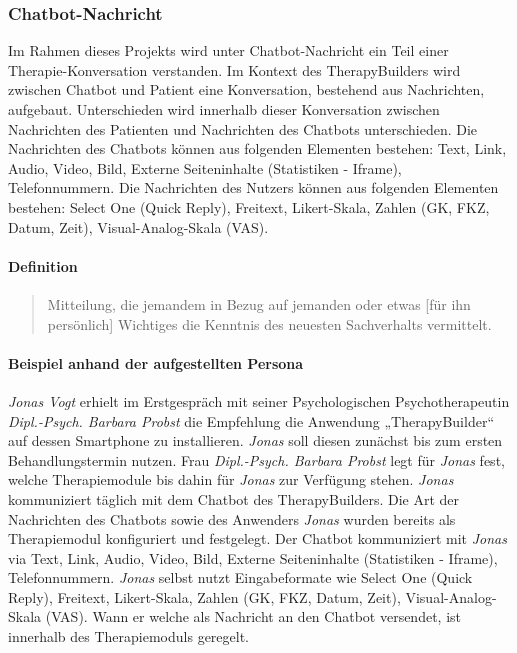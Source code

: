\subsubsection{Chatbot-Nachricht}
Im Rahmen dieses Projekts wird unter Chatbot-Nachricht ein Teil einer Therapie-Konversation verstanden. Im Kontext des TherapyBuilders wird zwischen Chatbot und Patient eine Konversation, bestehend aus Nachrichten, aufgebaut. Unterschieden wird innerhalb dieser Konversation zwischen Nachrichten des Patienten und Nachrichten des Chatbots unterschieden. Die Nachrichten des Chatbots können aus folgenden Elementen bestehen: Text, Link, Audio, Video, Bild, Externe Seiteninhalte (Statistiken - Iframe), Telefonnummern. Die Nachrichten des Nutzers können aus folgenden Elementen bestehen: Select One (Quick Reply), Freitext, Likert-Skala, Zahlen (GK, FKZ, Datum, Zeit), Visual-Analog-Skala (VAS).

\paragraph{Definition}
\begin{quote}
Mitteilung, die jemandem in Bezug auf jemanden oder etwas [für ihn persönlich] Wichtiges die Kenntnis des neuesten Sachverhalts vermittelt. \cite{DudenNac9:online}
\end{quote}

\paragraph{Beispiel anhand der aufgestellten Persona}
\emph{Jonas Vogt} erhielt im Erstgespräch mit seiner Psychologischen Psychotherapeutin \emph{Dipl.-Psych. Barbara Probst} die Empfehlung die Anwendung „TherapyBuilder“ auf dessen Smartphone zu installieren. \emph{Jonas} soll diesen zunächst bis zum ersten Behandlungstermin nutzen. Frau \emph{Dipl.-Psych. Barbara Probst} legt für \emph{Jonas} fest, welche Therapiemodule bis dahin für \emph{Jonas} zur Verfügung stehen. \emph{Jonas} kommuniziert täglich mit dem Chatbot des TherapyBuilders. Die Art der Nachrichten des Chatbots sowie des Anwenders \emph{Jonas} wurden bereits als Therapiemodul konfiguriert und festgelegt. Der Chatbot kommuniziert mit \emph{Jonas} via Text, Link, Audio, Video, Bild, Externe Seiteninhalte (Statistiken - Iframe), Telefonnummern. \emph{Jonas} selbst nutzt Eingabeformate wie Select One (Quick Reply), Freitext, Likert-Skala, Zahlen (GK, FKZ, Datum, Zeit), Visual-Analog-Skala (VAS). Wann er welche als Nachricht an den Chatbot versendet, ist innerhalb des Therapiemoduls geregelt.

